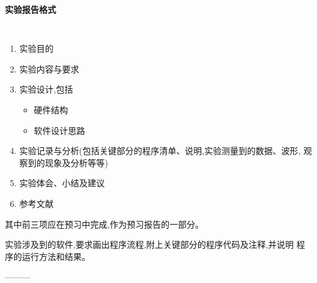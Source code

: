 \setcounter{chapter}{0}
\begin{center} \LARGE \bf \textsf{实验报告格式} \end{center}
\large \tt
\begin{enumerate}\itemsep=-3pt
  \item 实验目的
  \item 实验内容与要求
  \item 实验设计,包括
  \begin{itemize}
    \item 硬件结构
    \item 软件设计思路
  \end{itemize}
  \item 实验记录与分析(包括关键部分的程序清单、说明,实验测量到的数据、波形,
        观察到的现象及分析等等)
  \item 实验体会、小结及建议
  \item 参考文献
\end{enumerate}
其中前三项应在预习中完成,作为预习报告的一部分。

    实验涉及到的软件,要求画出程序流程,附上关键部分的程序代码及注释,并说明
程序的运行方法和结果。

\begin{center} --------- \end{center}
\iffalse

    *实验提倡独立思考,鼓励创新钻研。教师在指导实验中可适当地配以示教,但不
提倡简单的``有问必答''。
  
    *学生实验结束,须经教师检查签字认可,并及时书写实验报告。实验报告应以原始
记录为依据,可在预习报告的基础上,增添整理实验纪录和分析、实验体会与小结。
实验报告应及时完成。
\fi
\rm\normalsize
